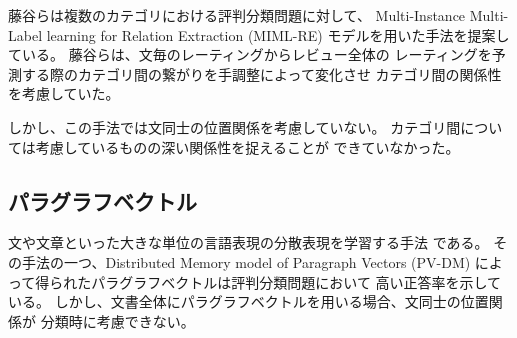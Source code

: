\documentclass{ttisummary}
\begin{document}
藤谷ら\cite{fujitani15}は複数のカテゴリにおける評判分類問題に対して、
Multi-Instance Multi-Label learning for Relation Extraction (MIML-RE)
\cite{mihai12}モデルを用いた手法を提案している。
藤谷ら\cite{fujitani15}は、文毎のレーティングからレビュー全体の
レーティングを予測する際のカテゴリ間の繋がりを手調整によって変化させ
カテゴリ間の関係性を考慮していた。

しかし、この手法では文同士の位置関係を考慮していない。
カテゴリ間については考慮しているものの深い関係性を捉えることが
できていなかった。


\subsection{パラグラフベクトル}

文や文章といった大きな単位の言語表現の分散表現を学習する手法\cite{quoc14}
である。
その手法の一つ、Distributed Memory model of Paragraph Vectors (PV-DM)
によって得られたパラグラフベクトルは評判分類問題において
高い正答率を示している\cite{quoc14}。
しかし、文書全体にパラグラフベクトルを用いる場合、文同士の位置関係が
分類時に考慮できない。
\end{document}
